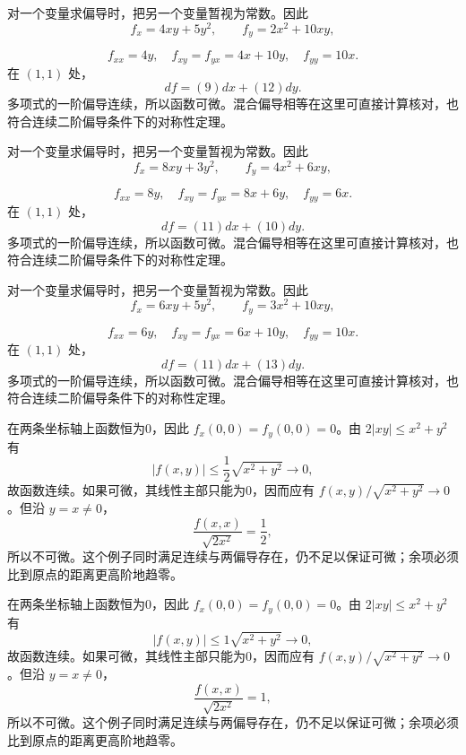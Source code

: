 \documentclass[12pt,fontset=fandol]{ctexart}
\begin{document}
\begin{solve}\label{ans:c32q17}
对一个变量求偏导时，把另一个变量暂视为常数。因此
\[
f_x=4xy+5y^2,\qquad f_y=2x^2+10xy,
\]

\[
f_{xx}=4y,\quad f_{xy}=f_{yx}=4x+10y,\quad f_{yy}=10x.
\]
在 $(1,1)$ 处，
\[
df=(9)dx+(12)dy.
\]
多项式的一阶偏导连续，所以函数可微。混合偏导相等在这里可直接计算核对，也符合连续二阶偏导条件下的对称性定理。
\end{solve}

\begin{solve}\label{ans:c32q18}
对一个变量求偏导时，把另一个变量暂视为常数。因此
\[
f_x=8xy+3y^2,\qquad f_y=4x^2+6xy,
\]

\[
f_{xx}=8y,\quad f_{xy}=f_{yx}=8x+6y,\quad f_{yy}=6x.
\]
在 $(1,1)$ 处，
\[
df=(11)dx+(10)dy.
\]
多项式的一阶偏导连续，所以函数可微。混合偏导相等在这里可直接计算核对，也符合连续二阶偏导条件下的对称性定理。
\end{solve}

\begin{solve}\label{ans:c32q19}
对一个变量求偏导时，把另一个变量暂视为常数。因此
\[
f_x=6xy+5y^2,\qquad f_y=3x^2+10xy,
\]

\[
f_{xx}=6y,\quad f_{xy}=f_{yx}=6x+10y,\quad f_{yy}=10x.
\]
在 $(1,1)$ 处，
\[
df=(11)dx+(13)dy.
\]
多项式的一阶偏导连续，所以函数可微。混合偏导相等在这里可直接计算核对，也符合连续二阶偏导条件下的对称性定理。
\end{solve}

\begin{solve}\label{ans:c32q20}
在两条坐标轴上函数恒为0，因此 $f_x(0,0)=f_y(0,0)=0$。由 $2|xy|\le x^2+y^2$ 有
\[
|f(x,y)|\le \frac{1}{2}\sqrt{x^2+y^2}\to0,
\]
故函数连续。如果可微，其线性主部只能为0，因而应有 $f(x,y)/\sqrt{x^2+y^2}\to0$。但沿 $y=x\ne0$，
\[
\frac{f(x,x)}{\sqrt{2x^2}}=\frac{1}{2},
\]
所以不可微。这个例子同时满足连续与两偏导存在，仍不足以保证可微；余项必须比到原点的距离更高阶地趋零。
\end{solve}

\begin{solve}\label{ans:c32q21}
在两条坐标轴上函数恒为0，因此 $f_x(0,0)=f_y(0,0)=0$。由 $2|xy|\le x^2+y^2$ 有
\[
|f(x,y)|\le 1\sqrt{x^2+y^2}\to0,
\]
故函数连续。如果可微，其线性主部只能为0，因而应有 $f(x,y)/\sqrt{x^2+y^2}\to0$。但沿 $y=x\ne0$，
\[
\frac{f(x,x)}{\sqrt{2x^2}}=1,
\]
所以不可微。这个例子同时满足连续与两偏导存在，仍不足以保证可微；余项必须比到原点的距离更高阶地趋零。
\end{solve}
\end{document}
